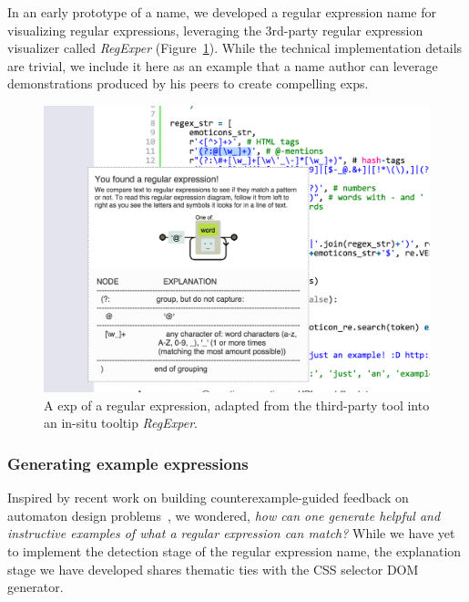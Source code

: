 In an early prototype of a \gls{name}, we developed a regular expression \gls{name} for visualizing regular expressions, leveraging the 3rd-party regular expression visualizer called \emph{RegExper} (Figure~\ref{fig:regex_visualization}).
While the technical implementation details are trivial, we include it here as an example that a \gls{name} author can leverage demonstrations produced by his peers to create compelling \glspl{exp}.

\begin{figure}
\centering
\includegraphics[width=\columnwidth]{figures/explain_on_select}
\caption{A \gls{exp} of a regular expression, adapted from the third-party tool into an in-situ tooltip \emph{RegExper}.}
\label{fig:regex_visualization}
\end{figure}

\subsubsection{Generating example expressions}

Inspired by recent work on building counterexample-guided feedback on automaton design problems~\cite{dantoni_how_2015}, we wondered, \emph{how can one generate helpful and instructive examples of what a regular expression can match?}
While we have yet to implement the detection stage of the regular expression \gls{name}, the explanation stage we have developed shares thematic ties with the CSS selector DOM generator. 
\fi

